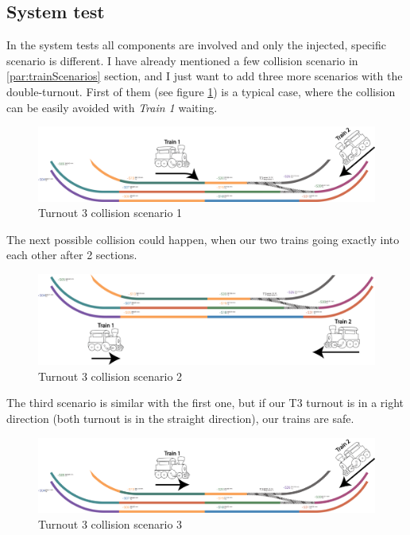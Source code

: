
\subsection{System test}
In the system tests all components are involved and only the injected, specific scenario is different. 
I have already mentioned a few collision scenario in \ref{par:trainScenarios} section, and I just want to add three more scenarios with the double-turnout. First of them (see figure \ref{fig:LayoutT3-scenario1}) is a typical case, where the collision can be easily avoided with \textit{Train 1} waiting.
\begin{figure}[!h]
	\centering
	\includegraphics[width=150mm, keepaspectratio]{figures/modes3/layoutT3-scenario1.png}
	\caption{Turnout 3 collision scenario 1}
	\label{fig:LayoutT3-scenario1}
\end{figure}

The next possible collision could happen, when our two trains going exactly into each other after 2 sections.
\begin{figure}[!h]
	\centering
	\includegraphics[width=150mm, keepaspectratio]{figures/modes3/layoutT3-scenario2.png}
	\caption{Turnout 3 collision scenario 2}
	\label{fig:LayoutT3-scenario2}
\end{figure}

The third scenario is similar with the first one, but if our T3 turnout is in a right direction (both turnout is in the straight direction), our trains are safe.
\begin{figure}[!h]
	\centering
	\includegraphics[width=150mm, keepaspectratio]{figures/modes3/layoutT3-scenario3.png}
	\caption{Turnout 3 collision scenario 3}
	\label{fig:LayoutT3-scenario3}
\end{figure}